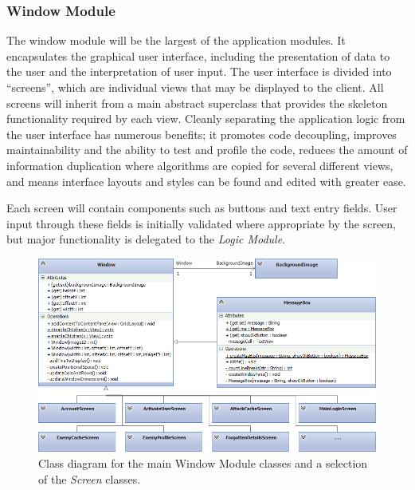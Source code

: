 \subsubsection{Window Module}
The window module will be the largest of the application modules. It encapsulates the graphical user interface, including the presentation of data to the user and the interpretation of user input. The user interface is divided into ``screens'', which are individual views that may be displayed to the client. All screens will inherit from a main abstract superclass that provides the skeleton functionality required by each view. Cleanly separating the application logic from the user interface has numerous benefits; it promotes code decoupling, improves maintainability and the ability to test and profile the code, reduces the amount of information duplication where algorithms are copied for several different views, and means interface layouts and styles can be found and edited with greater ease.

Each screen will contain components such as buttons and text entry fields. User input through these fields is initially validated where appropriate by the screen, but major functionality is delegated to the \emph{Logic Module}.

\begin{figure}[h!]
    \centering
    \includegraphics[width=\textwidth]{windowcd}
    \caption{Class diagram for the main Window Module classes and a selection of the \emph{Screen} classes.}
    \label{fig:windowclasses}
\end{figure}

